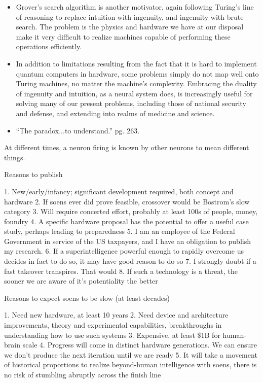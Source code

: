 \documentclass[twocolumn]{article}
\begin{document}
\begin{itemize}
\item Grover's search algorithm is another motivator, again following Turing's line of reasoning to replace intuition with ingenuity, and ingenuity with brute search. The problem is the physics and hardware we have at our disposal make it very difficult to realize machines capable of performing these operations efficiently. 
\item In addition to limitations resulting from the fact that it is hard to implement quantum computers in hardware, some problems simply do not map well onto Turing machines, no matter the machine's complexity. Embracing the duality of ingenuity and intuition, as a neural system does, is increasingly useful for solving many of our present problems, including those of national security and defense, and extending into realms of medicine and science.
\item ``The paradox...to understand.'' \cite{dy2012} pg. 263.
\end{itemize}


\vspace{2em}
At different times, a neuron firing is known by other neurons to mean different things.

\vspace{3em}
Reasons to publish

1. New/early/infancy; significant development required, both concept and hardware
2. If soens ever did prove feasible, crossover would be Bostrom's slow category
3. Will require concerted effort, probably at least 100s of people, money, foundry
4. A specific hardware proposal has the potential to offer a useful case study, perhaps leading to preparedness
5. I am an employee of the Federal Government in service of the US taxpayers, and I have an obligation to publish my research.
6. If a superintelligence powerful enough to rapidly overcome us decides in fact to do so, it may have good reason to do so
7. I strongly doubt if a fast takeover transpires. That would
8. If such a technology is a threat, the sooner we are aware of it's potentiality the better

Reasons to expect soens to be slow (at least decades)

1. Need new hardware, at least 10 years
2. Need device and architecture improvements, theory and experimental capabilities, breakthroughs in understanding how to use such systems
3. Expensive, at least \$1B for human-brain scale
4. Progress will come in distinct hardware generations. We can ensure we don't produce the next iteration until we are ready
5. It will take a movement of historical proportions to realize beyond-human intelligence with soens, there is no risk of stumbling abruptly across the finish line
\end{document}
